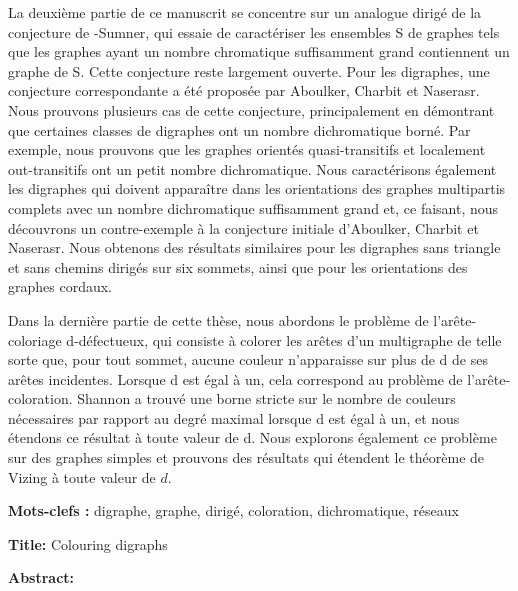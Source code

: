 {\vspace{0.2cm}
La deuxième partie de ce manuscrit se concentre sur un analogue dirigé de la conjecture de \Gya-Sumner, qui essaie de caractériser les ensembles S de graphes tels que les graphes ayant un nombre chromatique suffisamment grand contiennent  un  graphe  de  S.  Cette  conjecture  reste  largement  ouverte.  Pour  les  digraphes,  une  conjecture correspondante a été proposée par Aboulker, Charbit et Naserasr. Nous prouvons plusieurs cas de cette conjecture, principalement en démontrant que certaines classes de digraphes ont un nombre dichromatique borné. Par exemple, nous prouvons que les graphes orientés quasi-transitifs et localement out-transitifs ont un petit nombre dichromatique. Nous caractérisons également les digraphes qui doivent apparaître dans les orientations des graphes multipartis complets avec un nombre dichromatique suffisamment grand et, ce faisant, nous découvrons un contre-exemple à la conjecture initiale d'Aboulker, Charbit et Naserasr. Nous obtenons des résultats similaires pour les digraphes sans triangle et sans chemins dirigés sur six sommets, ainsi que pour les orientations des graphes cordaux. 

\vspace{0.2cm}
Dans la dernière partie de cette thèse, nous abordons le problème de l'arête-coloriage d-défectueux, qui consiste à colorer les arêtes d'un multigraphe de telle sorte que, pour tout sommet, aucune couleur n'apparaisse sur plus de d de ses arêtes incidentes. Lorsque d est égal à un, cela correspond au problème de l'arête-coloration. Shannon a trouvé une borne stricte sur le nombre de couleurs nécessaires par rapport au degré maximal lorsque d est égal à un, et nous étendons ce résultat à toute valeur de d. Nous explorons également ce problème sur des graphes simples et prouvons des résultats qui étendent le théorème de Vizing à toute valeur de $d$.

}

\vspace{0.6cm}

\noindent\textbf{Mots-clefs :} digraphe, graphe, dirigé, coloration, dichromatique, réseaux

\restoregeometry
\newpage
\thispagestyle{empty}


\noindent\textbf{Title:} Colouring digraphs

\vspace{0.5cm}


\noindent\textbf{Abstract:}

